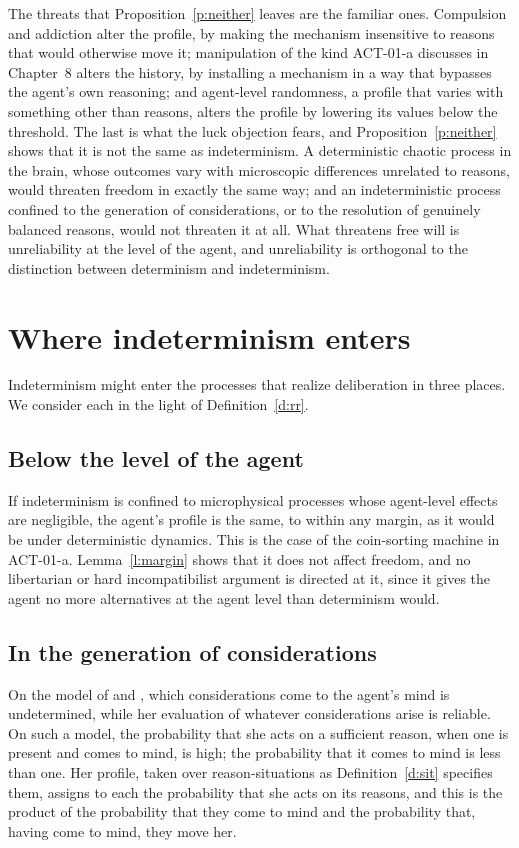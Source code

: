 \documentclass{situationist-preprint}
\begin{document}
The threats that Proposition~\ref{p:neither} leaves are the familiar ones. Compulsion and addiction alter the profile, by making the mechanism insensitive to reasons that would otherwise move it; manipulation of the kind ACT-01-a discusses in Chapter~8 alters the history, by installing a mechanism in a way that bypasses the agent's own reasoning; and agent-level randomness, a profile that varies with something other than reasons, alters the profile by lowering its values below the threshold. The last is what the luck objection fears, and Proposition~\ref{p:neither} shows that it is not the same as indeterminism. A deterministic chaotic process in the brain, whose outcomes vary with microscopic differences unrelated to reasons, would threaten freedom in exactly the same way; and an indeterministic process confined to the generation of considerations, or to the resolution of genuinely balanced reasons, would not threaten it at all. What threatens free will is unreliability at the level of the agent, and unreliability is orthogonal to the distinction between determinism and indeterminism.

\section{Where indeterminism enters}\label{s:loc}

Indeterminism might enter the processes that realize deliberation in three places. We consider each in the light of Definition~\ref{d:rr}.

\subsection{Below the level of the agent}

If indeterminism is confined to microphysical processes whose agent-level effects are negligible, the agent's profile is the same, to within any margin, as it would be under deterministic dynamics. This is the case of the coin-sorting machine in ACT-01-a. Lemma~\ref{l:margin} shows that it does not affect freedom, and no libertarian or hard incompatibilist argument is directed at it, since it gives the agent no more alternatives at the agent level than determinism would.

\subsection{In the generation of considerations}

On the model of \citet{Dennett1978} and \citet{Mele1995}, which considerations come to the agent's mind is undetermined, while her evaluation of whatever considerations arise is reliable. On such a model, the probability that she acts on a sufficient reason, when one is present and comes to mind, is high; the probability that it comes to mind is less than one. Her profile, taken over reason-situations as Definition~\ref{d:sit} specifies them, assigns to each the probability that she acts on its reasons, and this is the product of the probability that they come to mind and the probability that, having come to mind, they move her.
\end{document}

